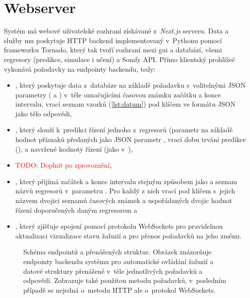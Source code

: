   \section{Webserver}
    Systém má webové uživatelské rozhraní získávané z~\emph{Next.js} serveru. Data a služby mu poskytuje HTTP backend implementovaný v~Pythonu pomocí frameworku Tornado, který tak tvoří rozhraní mezi \acrshort{gui} a databází, všemi regresory (predikce, simulace i učení) a Somfy API. Přímo klientský prohlížeč vykonává požadavky na endpointy backendu, tedy: 
    \begin{itemize}
      \item {}, který poskytuje data z~databáze na základě  požadavku s~volitelnými JSON parametry ( a ) v~těle označujícími časovou známku začátku a konce intervalu, vrací seznam vzorků (\cref{lst:datum}) pod klíčem  ve formátu JSON jako tělo odpovědi,
      \item {}, který slouží k~predikci řízení jednoho z~regresorů (parametr  na základě hodnot příznaků předaných jako JSON parametr , vrací dobu trvání predikce (),  a navržené hodnoty řízení (jako v~),
      \item {} \textcolor{red}{TODO: Doplnit po zprovoznění},
      \item {}, který přijímá začátek a konec intervalu stejným způsobem jako  a seznam názvů regresorů v~parametru . Pro každý z nich vrací pod klíčem s~jejich názvem dvojici seznamů časových známek a uspořádaných dvojic hodnot řízení doporučených daným regresorem a 
      \item {}, který zjišťuje spojení pomocí protokolu WebSockets pro pravidelnou aktualizaci vizualizace stavu žaluzií a pro přenos požadavků na jeho změnu.
    \end{itemize}
    
    
    \begin{figure}
      \centering
      
      \caption[Schéma endpointů a přenášených struktur]{Schéma endpointů a přenášených struktur. Obrázek znázorňuje endpointy backendu systému pro automatické ovládání žaluzií a datové struktury přenášené v~těle jednotlivých  požadavků a odpovědí. Zobrazuje také použitou metodu požadavků, v~posledním případě se nejedná o~metodu HTTP ale o~protokol WebSockets.}
      \label{fig:endpoints}
    \end{figure}